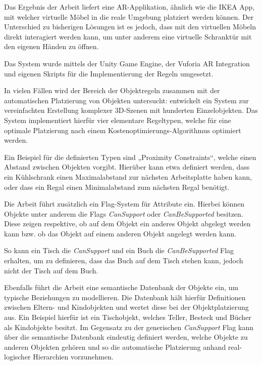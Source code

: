 Das Ergebnis der Arbeit liefert eine AR-Applikation, ähnlich wie die IKEA App, mit welcher virtuelle Möbel in die reale Umgebung platziert werden können. Der Unterschied zu bisherigen Lösungen ist es jedoch, dass mit den virtuellen Möbeln direkt interagiert werden kann, um unter anderem eine virtuelle Schranktür mit den eigenen Händen zu öffnen.

Das System wurde mittels der Unity Game Engine, der Vuforia AR Integration und eigenen Skripts für die Implementierung der Regeln umgesetzt.

\medskip

In vielen Fällen wird der Bereich der Objektregeln zusammen mit der automatischen Platzierung von Objekten untersucht: \textcite{xuConstraintbasedAutomaticPlacement2002} entwickelt ein System zur vereinfachten Erstellung komplexer 3D-Szenen mit hunderten Einzelobjekten. Das System implementiert hierfür vier elementare Regeltypen, welche für eine optimale Platzierung nach einem Kostenoptimierungs-Algorithmus optimiert werden.

Ein Beispiel für die definierten Typen sind „Proximity Constraints“, welche einen Abstand zwischen Objekten vorgibt. Hierüber kann etwa definiert werden, dass ein Kühlschrank einen Maximalabstand zur nächsten Arbeitsplatte haben kann, oder dass ein Regal einen Minimalabstand zum nächsten Regal benötigt.

Die Arbeit führt zusätzlich ein Flag-System für Attribute ein. Hierbei können Objekte unter anderem die Flags \textit{CanSupport} oder \textit{CanBeSupported} besitzen. Diese zeigen respektive, ob auf dem Objekt ein anderes Objekt abgelegt werden kann bzw. ob das Objekt auf einem anderen Objekt angelegt werden kann.

So kann ein Tisch die \textit{CanSupport} und ein Buch die \textit{CanBeSupported} Flag erhalten, um zu definieren, dass das Buch auf dem Tisch stehen kann, jedoch nicht der Tisch auf dem Buch.

Ebenfalls führt die Arbeit eine semantische Datenbank der Objekte ein, um typische Beziehungen zu modellieren. Die Datenbank hält hierfür Definitionen zwischen Eltern- und Kindobjekten und wertet diese bei der Objektplatzierung aus. Ein Beispiel hierfür ist ein Tischobjekt, welches Teller, Besteck und Bücher als Kindobjekte besitzt. Im Gegensatz zu der generischen \textit{CanSupport} Flag kann über die semantische Datenbank eindeutig definiert werden, welche Objekte zu anderen Objekten gehören und so die automatische Platzierung anhand real-logischer Hierarchien vorzunehmen.

